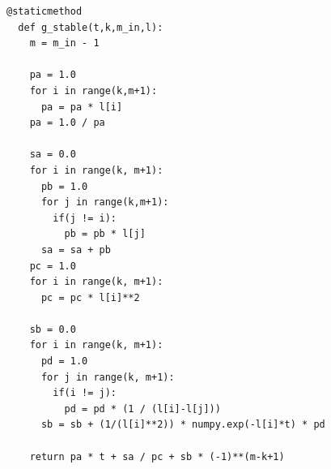 \documentclass[12pt,twoside]{manual}
\begin{document}
\begin{lstlisting}[style=spython, caption={}]
  @staticmethod
  def g_stable(t,k,m_in,l):
    m = m_in - 1

    pa = 1.0
    for i in range(k,m+1):
      pa = pa * l[i]
    pa = 1.0 / pa

    sa = 0.0
    for i in range(k, m+1):
      pb = 1.0
      for j in range(k,m+1):
        if(j != i):
          pb = pb * l[j]
      sa = sa + pb
    pc = 1.0 
    for i in range(k, m+1):
      pc = pc * l[i]**2

    sb = 0.0
    for i in range(k, m+1):
      pd = 1.0
      for j in range(k, m+1):
        if(i != j):
          pd = pd * (1 / (l[i]-l[j]))
      sb = sb + (1/(l[i]**2)) * numpy.exp(-l[i]*t) * pd

    return pa * t + sa / pc + sb * (-1)**(m-k+1)  
      
\end{lstlisting}
\end{document}
